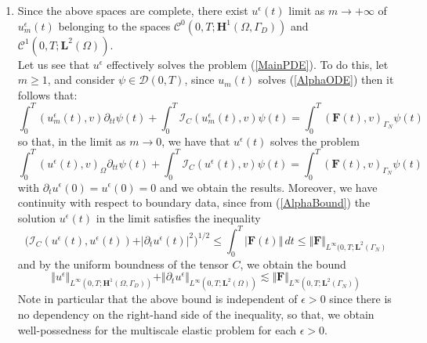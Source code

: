 \begin{enumerate}
    
    \item Since the above spaces are complete, there exist $u^{\epsilon}(t)$ limit as $m \longrightarrow +\infty$ of $u^{\epsilon}_m(t)$ belonging to the spaces $\mathcal{C}^0(0,T; \mathbf{H}^1(\Omega, \Gamma_D))$ and $\mathcal{C}^1(0,T; \mathbf{L}^2(\Omega))$.\\
    Let us see that $u^{\epsilon}$ effectively solves the problem (\ref{MainPDE}). To do this, let $m \geq 1$, and consider $\psi \in \mathcal{D}(0,T)$, since $u_m(t)$ solves (\ref{AlphaODE}) then it follows that:
    \begin{equation*}
        \int_0^T (u_m^{\epsilon}(t),v) \partial_{tt}\psi(t) + \int_0^T \mathcal{I}_C (u_m^{\epsilon}(t),v) \psi(t)  = \int_0^T (\mathbf{F}(t),v)_{\Gamma_N} \psi(t) 
    \end{equation*}
    so that, in the limit as $m \longrightarrow 0$, we have that $u^{\epsilon}(t)$ solves the problem
    \begin{equation*}
        \int_0^T (u^{\epsilon}(t),v)_{\Omega} \partial_{tt}\psi(t) + \int_0^T \mathcal{I}_C (u^{\epsilon}(t),v) \psi(t) = \int_0^T (\mathbf{F}(t),v)_{\Gamma_N}\psi(t) 
    \end{equation*}
    with $\partial_t u^{\epsilon}(0) = u^{\epsilon}(0) = 0$ and we obtain the results. Moreover, we have continuity with respect to boundary data, since from (\ref{AlphaBound}) the solution $u^{\epsilon}(t)$ in the limit satisfies the inequality 
    \begin{equation*}
        \big( \mathcal{I}_C(u^{\epsilon}(t), u^{\epsilon}(t))+ \vert \partial_t u^{\epsilon}(t) \vert^2 \big)^{1/2} \leq \int_0^T \vert \mathbf{F}(t) \Vert \, dt \leq \Vert \mathbf{F}\Vert_{L^{\infty}(0,T;\mathbf{L}^2(\Gamma_N)}
    \end{equation*}
    and by the uniform boundness of the tensor $C$, we obtain the bound
    \begin{equation*}
        \Vert u^{\epsilon} \Vert_{L^{\infty}(0,T;\mathbf{H}^1(\Omega, \Gamma_D))}  + \Vert \partial_t u^{\epsilon} \Vert_{L^{\infty}(0,T;\mathbf{L}^2(\Omega))} \lesssim \Vert \mathbf{F}\Vert_{L^{\infty}(0,T; \mathbf{L}^2(\Gamma_N))}
    \end{equation*}
    Note in particular that the above bound is independent of $\epsilon > 0$ since there is no dependency on the right-hand side of the inequality, so that, we obtain well-possedness for the multiscale elastic problem for each $\epsilon > 0$.
\end{enumerate}

